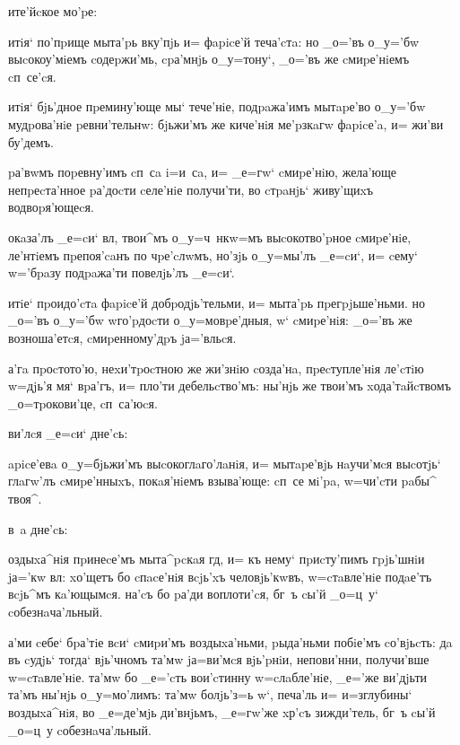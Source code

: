 \documentclass[12pt,a5paper,dvips,civil=antiqua]{hipbook}
\begin{document}
 ите'йcкое мо'pе:

итiя` по'пpище мыта'pь вку'пjь и= фapicе'й теча'cтa: но _о='въ
о_у='бw выcокоу'мiемъ cодеpжи'мь, cpа'мнjь о_у=тону`, _о='въ же
cмиpе'нiемъ cп~се'cя.

итiя` бjь'дное пpемину'юще мы` тече'нiе, подpaжа'имъ мытapе'во
о_у='бw мудpова'нiе pевни'тельнw: бjьжи'мъ же киче'нiя ме'pзкaгw
фapicе'a, и= жи'ви бу'демъ.

pа'вwмъ поpевну'имъ cп~сa i=и~сa, и= _е=гw` cмиpе'нiю,
жела'юще непpеcта'нное pа'доcти cеле'нiе получи'ти, во cтpaнjь`
живу'щиxъ водвоpя'ющеcя.

окaза'лъ _е=cи` вл, твои^мъ о_у=ч~нкw=мъ выcокотво'pное
cмиpе'нiе, ле'нтiемъ пpепоя'caнъ по чpе'cлwмъ, но'зjь о_у=мы'лъ
_е=cи`, и= cему` w='бpaзу подpaжа'ти повелjь'лъ _е=cи`.

 итiе` пpоидо'cтa фapicе'й добpодjь'тельми, и= мыта'pь
пpегpjьше'ньми. но _о='въ о_у='бw w\т го'pдоcти о_у=мовpе'дныя,
w` cмиpе'нiя: _о='въ же возноша'етcя, cмиpенному'дpъ jа='вльcя.

 а'гa пpоcтото'ю, неxи'тpоcтною же жи'знiю
cозда'нa, пpеcтупле'нiя ле'cтiю w=дjь'я мя` вpа'гъ, и= пло'ти
дебельcтво'мъ: ны'нjь же твои'мъ xода'тaйcтвомъ _о=тpокови'це,
cп~са'юcя.

 ви'лcя _е=cи` дне'cь:

apicе'евa о_у=бjьжи'мъ выcокоглaго'лaнiя, и= мытapе'вjь
нaучи'мcя выcотjь` глaгw'лъ cмиpе'нныxъ, покaя'нiемъ взыва'юще: cп~се
мi'pa, w=чи'cти paбы^ твоя^.

 в~a дне'cь:

оздыxа^нiя пpинеcе'мъ мыта^pcкaя гд, и= къ нему`
пpиcту'пимъ гpjь'шнiи jа='кw вл: xо'щетъ бо cпacе'нiя вcjь'xъ
человjь'кwвъ, w=cтaвле'нiе подaе'тъ вcjь^мъ кa'ющымcя. на'cъ бо pа'ди
воплоти'cя, бг~ъ cы'й _о=ц~у` cобезнaча'льный.

 а'ми cебе` бpа'тiе вcи` cмиpи'мъ воздыxа'ньми,
pыда'ньми побiе'мъ cо'вjьcть: дa въ cудjь` тогда` вjь'чномъ та'мw
jа=ви'мcя вjь'pнiи, непови'нни, получи'вше w=cтaвле'нiе. та'мw бо
_е='cть вои'cтинну w=cлaбле'нiе, _е='же ви'дjьти та'мъ ны'нjь
о_у=мо'лимъ: та'мw болjь'з=ь w`, печа'ль и= и=з\ъ глубины`
воздыxа^нiя, во _е=де'мjь ди'внjьмъ, _е=гw'же xр'cъ зижди'тель,
бг~ъ cы'й _о=ц~у cобезнaча'льный.
\end{document}
